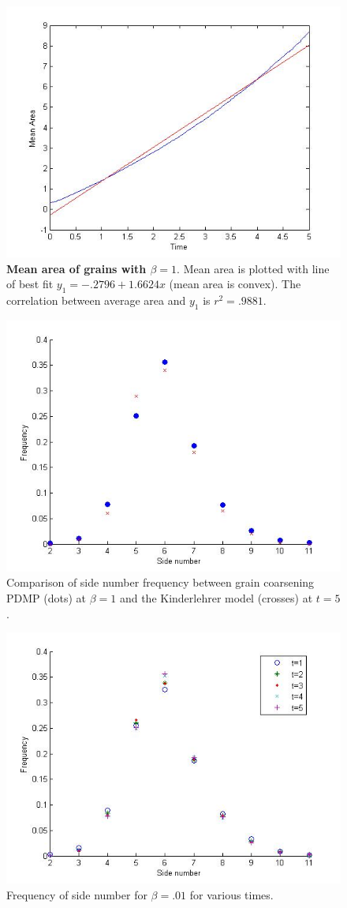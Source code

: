 \begin{figure}
  \begin{centering}
\includegraphics[width=.5\textwidth]{meanregareaone.jpg}
\caption{\textbf{Mean area of grains with $\beta = 1.$} Mean area is plotted with line of best fit $y_1 = -.2796+1.6624x$   (mean area is convex). The correlation between average area and $y_1$ is $r^2= .9881$. }\label{av3}
\end{centering}
\end{figure}



\begin{figure}
\begin{centering}
\includegraphics[width=.5\textwidth]{kindocompare.jpg}
\caption{Comparison of side number frequency between grain coarsening PDMP (dots) at $\beta= 1$ and the Kinderlehrer model (crosses) at $t= 5$.}\label{kindcompare}
\end{centering}
\end{figure}

\begin{figure}
        \begin{centering}
        \includegraphics[width=.5\textwidth]{classdistzero.jpg}
        \caption{Frequency of side number for $\beta= .01$ for various times.}\label{sidedist1}
\end{centering}
\end{figure}

